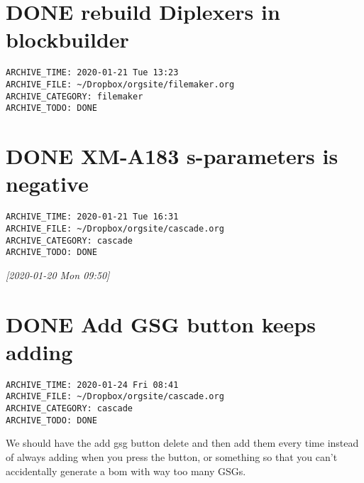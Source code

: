 \documentclass[11pt]{article}
\begin{document}
\section*{{\bfseries\sffamily DONE}  rebuild Diplexers in blockbuilder}
\label{sec:orgb5df6ee}
\begin{verbatim}
ARCHIVE_TIME: 2020-01-21 Tue 13:23
ARCHIVE_FILE: ~/Dropbox/orgsite/filemaker.org
ARCHIVE_CATEGORY: filemaker
ARCHIVE_TODO: DONE
\end{verbatim}
\section*{{\bfseries\sffamily DONE}  XM-A183 s-parameters is negative}
\label{sec:orgf7b4110}
\begin{verbatim}
ARCHIVE_TIME: 2020-01-21 Tue 16:31
ARCHIVE_FILE: ~/Dropbox/orgsite/cascade.org
ARCHIVE_CATEGORY: cascade
ARCHIVE_TODO: DONE
\end{verbatim}
\textit{[2020-01-20 Mon 09:50]}\\
\section*{{\bfseries\sffamily DONE}  Add GSG button keeps adding}
\label{sec:orgdca2f1e}
\begin{verbatim}
ARCHIVE_TIME: 2020-01-24 Fri 08:41
ARCHIVE_FILE: ~/Dropbox/orgsite/cascade.org
ARCHIVE_CATEGORY: cascade
ARCHIVE_TODO: DONE
\end{verbatim}
We should have the add gsg button delete and then add them every time instead of always adding when you press the button, or something so that you can't accidentally generate a bom with way too many GSGs.\\
\end{document}
